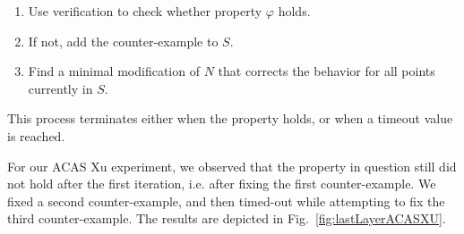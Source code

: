 \documentclass{easychair}
\begin{document}
\begin{enumerate}
\item Use verification to check whether property $\varphi$ holds.
\item If not, add the counter-example to $S$.
\item Find a minimal modification of $N$ that corrects the behavior
  for  all points currently in $S$.
\end{enumerate}

This process terminates either when the property holds, or when a
timeout value is reached. 

For our ACAS Xu experiment, we observed that the property in question
still did not hold after the first iteration, i.e. after fixing the
first counter-example. We fixed a second counter-example, and then
timed-out while attempting to fix the third counter-example.
The results are depicted in Fig.~\ref{fig:lastLayerACASXU}.
\end{document}
